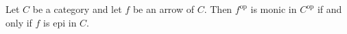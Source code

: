 Let $C$ be a category and let $f$ be an arrow of $C$. Then $f^{\text{op}}$ is monic in $C^{\text{op}}$ if and only if $f$ is epi in $C$.
